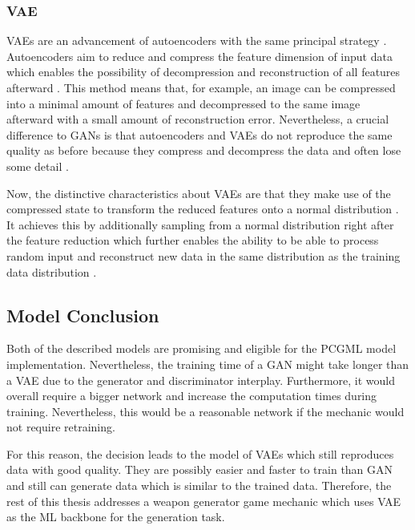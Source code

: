 \documentclass[MGS,Master,english]{twbook}%
\begin{document}
\subsubsection{\acl{VAE}}
\acp{VAE} are an advancement of autoencoders with the same principal strategy \cite{ml::vae::tutorial}. Autoencoders aim to reduce and compress the feature dimension of input data which enables the possibility of decompression and reconstruction of all features afterward \cite{ml::book::nnProgrammingTF}. This method means that, for example, an image can be compressed into a minimal amount of features and decompressed to the same image afterward with a small amount of reconstruction error. Nevertheless, a crucial difference to \acp{GAN} is that autoencoders and \acp{VAE} do not reproduce the same quality as before because they compress and decompress the data and often lose some detail \cite{ml::book::nnProgrammingTF}. 

Now, the distinctive characteristics about \acp{VAE} are that they make use of the compressed state to transform the reduced features onto a normal distribution \cite{ml::vae::tutorial}. It achieves this by additionally sampling from a normal distribution right after the feature reduction which further enables the ability to be able to process random input and reconstruct new data in the same distribution as the training data distribution \cite{ml::vae::tutorial}.

\subsection{Model Conclusion}
Both of the described models are promising and eligible for the PCGML model implementation. Nevertheless, the training time of a \ac{GAN} might take longer than a \ac{VAE} due to the generator and discriminator interplay. Furthermore, it would overall require a bigger network and increase the computation times during training. Nevertheless, this would be a reasonable network if the mechanic would not require retraining.

For this reason, the decision leads to the model of \acp{VAE} which still reproduces data with good quality. They are possibly easier and faster to train than \ac{GAN} and still can generate data which is similar to the trained data. Therefore, the rest of this thesis addresses a weapon generator game mechanic which uses \ac{VAE} as the ML backbone for the generation task.
\end{document}
